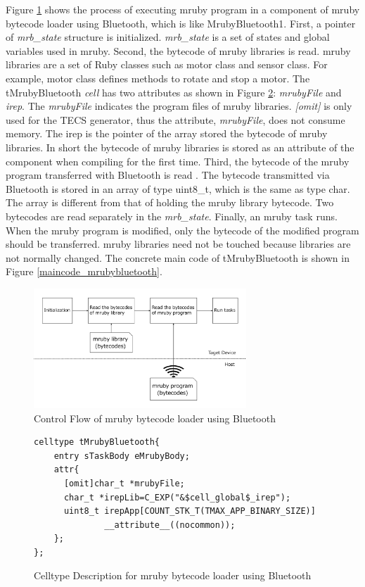 \documentclass[conference,compsoc]{IEEEtran}
\begin{document}
Figure \ref{fig:control_flow} shows the process of executing mruby program in a component of mruby bytecode loader using Bluetooth, which is like MrubyBluetooth1.
First, a pointer of {\it mrb\_state} structure is initialized.
{\it mrb\_state} is a set of states and global variables used in mruby.
Second, the bytecode of mruby libraries is read.
mruby libraries are a set of Ruby classes such as motor class and sensor class.
For example, motor class defines methods to rotate and stop a motor.
The tMrubyBluetooth {\it cell} has two attributes as shown in Figure \ref{celltype_mrubybluetooth}: {\it mrubyFile} and {\it irep}.
The {\it mrubyFile} indicates the program files of mruby libraries.
{\it [omit]} is only used for the TECS generator, thus the attribute, {\it mrubyFile}, does not consume memory.
The irep is the pointer of the array stored the bytecode of mruby libraries.
In short the bytecode of mruby libraries is stored as an attribute of the component when compiling for the first time.
Third, the bytecode of the mruby program transferred with Bluetooth is read .
The bytecode transmitted via Bluetooth is stored in an array of type uint8\_t, which is the same as type char.
The array is different from that of holding the mruby library bytecode.
Two bytecodes are read separately in the {\it mrb\_state}.
Finally, an mruby task runs.
When the mruby program is modified, only the bytecode of the modified program should be transferred.
mruby libraries need not be touched because libraries are not normally changed.
The concrete main code of tMrubyBluetooth is shown in Figure \ref{maincode_mrubybluetooth}.
\begin{figure}[t]
    \centering
    \includegraphics[width=8cm,clip]{figure/control_flow.pdf}
    \caption{Control Flow of mruby bytecode loader using Bluetooth}
    \label{fig:control_flow}
\end{figure}
\begin{figure}[t]
\centering
\begin{lstlisting}
celltype tMrubyBluetooth{
    entry sTaskBody eMrubyBody;
    attr{
      [omit]char_t *mrubyFile;
      char_t *irepLib=C_EXP("&$cell_global$_irep");
      uint8_t irepApp[COUNT_STK_T(TMAX_APP_BINARY_SIZE)]
              __attribute__((nocommon));
    };
};
\end{lstlisting}
\caption{Celltype Description for mruby bytecode loader using Bluetooth}
\label{celltype_mrubybluetooth}
\end{figure}
\end{document}
